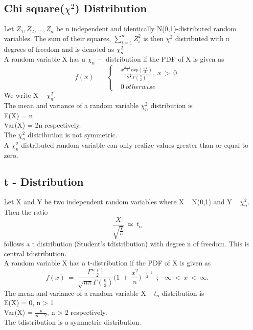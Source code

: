 \subsection*{Chi square($\chi^2$) Distribution}
Let $Z_1, Z_2,..., Z_n$ be n independent and identically N(0,1){-}distributed
random variables. The sum of their squares, $\sum_{i=1}^{n}Z_i^2$ is then $\chi^2$ distributed with n degrees of freedom and is denoted as $\chi_n^2$\\
A random variable X has a $\chi_n-$ distribution if the PDF of X is given as
\[
f(x)\ =\ 
\begin{cases}
& \frac{x^{\frac{n-2}{2}}exp(\frac{-x}{2})}{2^{\frac{n}{2}}\Gamma\binom{n}{2}},\ x\ >\ 0 \\
& 0\ otherwise
\end{cases}
\]
We write X ~ $\chi_n^2$.\\
The mean and variance of a random variable $\chi_n^2$ distribution is \\
E(X) = n\\
Var(X) = 2n   respectively.\\
The $\chi_n^2$ distribution is not symmetric.\\
A $\chi_n^2$ distributed random variable can only realize values greater than
or equal to zero.

\subsection*{t {-} Distribution}
Let X and Y be two independent random variables where X ~ N(0,1)
and Y ~ $\chi_n^2$. Then the ratio
\[ \frac{X}{\sqrt{\frac{Y}{n}}}\ \simeq\ t_n \]
follows a t \- distribution (Student's t\-distribution) with degree n of freedom. This is central t\-distribution.\\
A random variable X has a t{-}distribution if the PDF of X is given as
\[
f(x)\ =\ \frac{\Gamma\frac{n+1}{2}}{\sqrt{n\pi}\Gamma\binom{n}{2}}\Bigg(1\ +\ \frac{x^2}{n}\Bigg)^\frac{-n-1}{2}\ \ ; -\infty\ <\ x\ <\ \infty.
\]
The mean and variance of a random variable X ~ $t_n$ distribution is \\
E(X) = 0, n > 1\\
Var(X) = $\frac{n}{n-2}$, n > 2  respectively.\\
The t\-distribution is a symmetric distribution.

